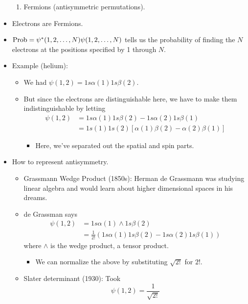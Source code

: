 \documentclass[../notes.tex]{subfiles}
\begin{document}
\begin{itemize}
\begin{enumerate}
        \item Fermions (antisymmetric permutations).
    \end{enumerate}
    \item Electrons are Fermions.
    \item $\operatorname{Prob}=\psi^*(1,2,\dots,N)\psi(1,2,\dots,N)$ tells us the probability of finding the $N$ electrons at the positions specified by 1 through $N$.
    \item Example (helium):
    \begin{itemize}
        \item We had $\psi(1,2)=1s\alpha(1)1s\beta(2)$.
        \item But since the electrons are distinguishable here, we have to make them indistinguishable by letting
        \begin{align*}
            \psi(1,2) &= 1s\alpha(1)1s\beta(2)-1s\alpha(2)1s\beta(1)\\
            &= 1s(1)1s(2)[\alpha(1)\beta(2)-\alpha(2)\beta(1)]
        \end{align*}
        \begin{itemize}
            \item Here, we've separated out the spatial and spin parts.
        \end{itemize}
    \end{itemize}
    \item How to represent antisymmetry.
    \begin{itemize}
        \item Grassmann Wedge Product (1850s): Herman de Grassmann was studying linear algebra and would learn about higher dimensional spaces in his dreams.
        \item de Grassman says
        \begin{align*}
            \psi(1,2) &= 1s\alpha(1)\wedge 1s\beta(2)\\
            &= \frac{1}{2!}(1s\alpha(1)1s\beta(2)-1s\alpha(2)1s\beta(1))
        \end{align*}
        where $\wedge$ is the wedge product, a tensor product.
        \begin{itemize}
            \item We can normalize the above by substituting $\sqrt{2!}$ for $2!$.
        \end{itemize}
        \item Slater determinant (1930): Took
        \begin{equation*}
            \psi(1,2) = \frac{1}{\sqrt{2!}}

\end{equation*}
\end{itemize}
\end{itemize}
\end{document}
